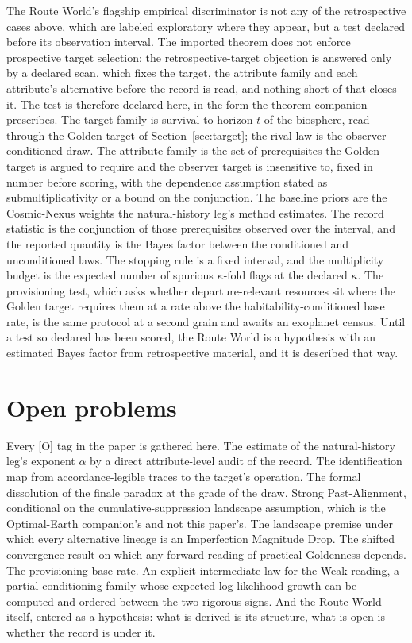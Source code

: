The Route World's flagship empirical discriminator is not any of the
retrospective cases above, which are labeled exploratory where they
appear, but a test declared before its observation interval. The imported theorem does not enforce prospective target selection; the retrospective-target objection is answered only by a declared scan, which fixes the target, the attribute family and each attribute's alternative before the record is read, and nothing short of that closes it. The test is therefore declared here, in the form the
theorem companion prescribes. The target family is survival to horizon
$t$ of the biosphere, read through the Golden target of
Section~\ref{sec:target}; the rival law is the observer-conditioned
draw. The attribute family is the set of prerequisites the Golden target
is argued to require and the observer target is insensitive to, fixed in
number before scoring, with the dependence assumption stated as
submultiplicativity or a bound on the conjunction. The baseline priors are
the Cosmic-Nexus weights the natural-history leg's method estimates. The
record statistic is the conjunction of those prerequisites observed over
the interval, and the reported quantity is the Bayes factor between the
conditioned and unconditioned laws. The stopping rule is a fixed
interval, and the multiplicity budget is the expected number of spurious
$\kappa$-fold flags at the declared $\kappa$. The provisioning test, which
asks whether departure-relevant resources sit where the Golden target
requires them at a rate above the habitability-conditioned base rate,
is the same protocol at a second grain and awaits an exoplanet census.
Until a test so declared has been scored, the Route World is a hypothesis
with an estimated Bayes factor from retrospective material, and it is
described that way.

\section{Open problems}\label{sec:open}

Every [O] tag in the paper is gathered here. The estimate of the
natural-history leg's exponent $\alpha$ by a direct attribute-level audit
of the record. The identification map from accordance-legible traces to
the target's operation. The formal dissolution of the finale paradox at
the grade of the draw. Strong Past-Alignment, conditional on the
cumulative-suppression landscape assumption, which is the Optimal-Earth
companion's and not this paper's. The landscape premise under which every
alternative lineage is an Imperfection Magnitude Drop. The shifted
convergence result on which any forward reading of practical Goldenness
depends. The provisioning base rate. An explicit intermediate law for the Weak reading, a
partial-conditioning family whose expected log-likelihood growth can be
computed and ordered between the two rigorous signs. And the Route World
itself, entered as a hypothesis: what is derived is its structure, what
is open is whether the record is under it.

